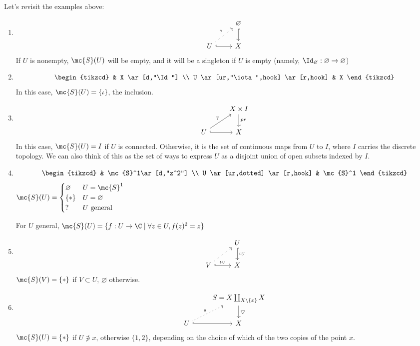 \documentclass[x11names,reqno,14pt]{extarticle}
\begin{document}
Let's revisit the examples above:
\begin{enumerate}

\item 
\[
\begin{tikzcd}
& \varnothing \ar[d, hook] \\
U \ar[ur,dotted,"?"] \ar[r,hook] & X
\end{tikzcd}
\]
If $U$ is nonempty, $\mc{S}(U)$ will be empty, and it will be a singleton if $U$ is empty (namely, $\Id_{\varnothing}:\varnothing\to\varnothing$)

\item 
\[
\begin{tikzcd}
& X \ar[d,"\Id"] \\
U \ar[ur,"\iota",hook] \ar[r,hook] & X
\end{tikzcd}
\]
In this case, $\mc{S}(U) = \{\iota\}$, the inclusion.

\item 
\[
\begin{tikzcd}
& X \times I\ar[d,"pr"] \\
U \ar[ur,"?"] \ar[r,hook] & X
\end{tikzcd}
\]
In this case, $\mc{S}(U) = I$ if $U$ is connected. Otherwise, it is the set of continuous maps from $U$ to $I$, where $I$ carries the discrete topology. We can also think of this as the set of ways to express $U$ as a disjoint union of open subsets indexed by $I$.

\item 
\[
\begin{tikzcd}
& \mc{S}^1\ar[d,"z^2"] \\
U \ar[ur,dotted] \ar[r,hook] & \mc{S}^1
\end{tikzcd}
\]
$\mc{S}(U) = \begin{cases} \varnothing & U = \mc{S}^1 \\ \{*\} & U = \varnothing \\ ? & U \text{ general} \end{cases}$

For $U$ general, $\mc{S}(U)  = \{f:U\to\C \mid \forall z \in U, f(z)^2 = z\}$

\item 
\[
\begin{tikzcd}
& U \ar[d, hook, "\iota_U"] \\
V \ar[r,hook,"\iota_V"] \ar[ur, dotted] & X
\end{tikzcd}
\]
$\mc{S}(V) = \{*\}$ if $V \subset U$, $\varnothing$ otherwise. 

\item 
\[
\begin{tikzcd}
& S = X\coprod_{X\setminus\{x\}} X \ar[d, "\bigtriangledown"] \\
U \ar[ur,dotted,"s"] \ar[r,hook] & X 
\end{tikzcd}
\]
$\mc{S}(U) = \{*\}$ if $U\not\ni x$, otherwise $\{1,2\}$, depending on the choice of which of the two copies of the point $x$. 


\end{enumerate}
\end{document}
